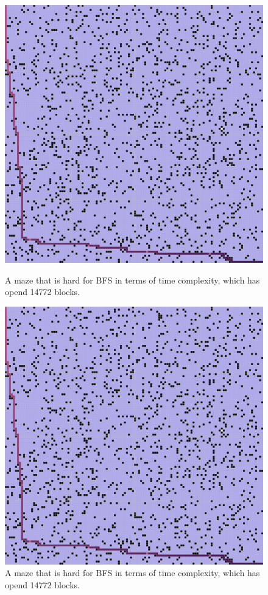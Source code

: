 \documentclass[letter]{article}
\begin{document}
\begin{enumerate}[resume]
\begin{enumerate}
\begin{enumerate}
\begin{figure}
					\includegraphics[width=\textwidth]{../pics/bb/14772_2.png}
					\caption{\label{fig:bb2}A maze that is hard for BFS in terms of time complexity, which has opend 14772 blocks.}
					\endminipage\hfill
					\includegraphics[width=\textwidth]{../pics/bb/14772.png}
					\caption{\label{fig:bb3} A maze that is hard for BFS in terms of time complexity, which has opend 14772 blocks.}
					\endminipage
					\endminipage 
				\end{figure}
				

\end{enumerate}
\end{enumerate}
\end{enumerate}
\end{document}
